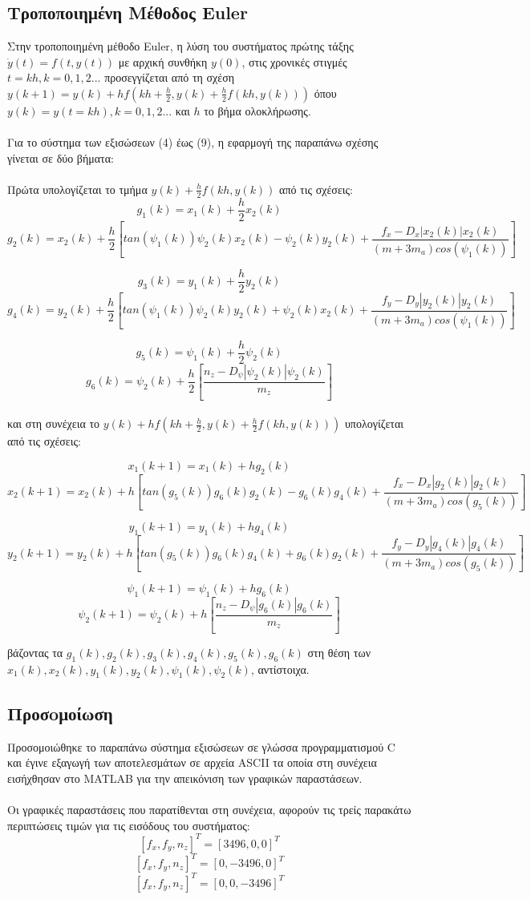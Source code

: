 \documentclass{article}
\begin{document}
\subsection{Τροποποιημένη Μέθοδος Euler}
Στην τροποποιημένη μέθοδο Euler, η λύση του συστήματος πρώτης τάξης \(\dot{y}(t) = f(t, y(t))\) με αρχική συνθήκη \(y(0)\), στις χρονικές στιγμές \(t = kh, k = 0, 1, 2...\) προσεγγίζεται από τη σχέση \(y(k+1) = y(k) + hf(kh + \frac{h}{2}, y(k) + \frac{h}{2}f(kh, y(k)))\) όπου \(y(k) = y(t = kh), k = 0, 1, 2...\) και \(h\) το βήμα ολοκλήρωσης.
\\\\
Για το σύστημα των εξισώσεων (4) έως (9), η εφαρμογή της παραπάνω σχέσης γίνεται σε δύο βήματα:
\\\\
Πρώτα υπολογίζεται το τμήμα \(y(k) + \frac{h}{2}f(kh, y(k))\) από τις σχέσεις: 
\[g_1(k) = x_1(k) + \frac{h}{2}x_2(k)\]
\[g_2(k) = x_2(k) + \frac{h}{2}[tan(\psi_1(k))\psi_2(k)x_2(k) - \psi_2(k)y_2(k) + \frac{f_x - D_x|x_2(k)|x_2(k)}{(m + 3m_a)cos(\psi_1(k))}]\]

\[ g_3(k)   = y_1(k) + \frac{h}{2}y_2(k)   \]
\[g_4(k) = y_2(k) + \frac{h}{2}[tan(\psi_1(k))\psi_2(k)y_2(k) + \psi_2(k)x_2(k) + \frac{f_y - D_y|y_2(k)|y_2(k)}{(m + 3m_a)cos(\psi_1(k))}]\]


\[ g_5(k)   = \psi_1(k) + \frac{h}{2}\psi_2(k)   \]
\[ g_6(k) = \psi_2(k) + \frac{h}{2}[\frac{n_z - D_\psi|\psi_2(k)|\psi_2(k)}{m_z}]\]
\\
και στη συνέχεια το \(y(k) + hf(kh + \frac{h}{2}, y(k) + \frac{h}{2}f(kh, y(k)))\) υπολογίζεται από τις σχέσεις:

\[x_1(k+1) = x_1(k) + hg_2(k)\]
\[x_2(k+1) = x_2(k) + h[tan(g_5(k))g_6(k)g_2(k) - g_6(k)g_4(k) + \frac{f_x - D_x|g_2(k)|g_2(k)}{(m + 3m_a)cos(g_5(k))}]\]

\[ y_1(k+1)   = y_1(k) + hg_4(k)   \]
\[y_2(k+1) = y_2(k) + h[tan(g_5(k))g_6(k)g_4(k) + g_6(k)g_2(k) + \frac{f_y - D_y|g_4(k)|g_4(k)}{(m + 3m_a)cos(g_5(k))}]\]


\[ \psi_1(k+1)   = \psi_1(k) + hg_6(k)   \]
\[ \psi_2(k+1) = \psi_2(k) + h[\frac{n_z - D_\psi|g_6(k)|g_6(k)}{m_z}]\]

βάζοντας τα \(g_1(k), g_2(k), g_3(k), g_4(k), g_5(k), g_6(k)\) στη θέση των \(x_1(k), x_2(k), y_1(k), y_2(k), \psi_1(k), \psi_2(k)\), αντίστοιχα.

\subsection{Προσoμοίωση}
Προσομοιώθηκε το παραπάνω σύστημα εξισώσεων σε γλώσσα προγραμματισμού C και έγινε εξαγωγή των αποτελεσμάτων σε αρχεία ASCII τα οποία στη συνέχεια εισήχθησαν στο MATLAB για την απεικόνιση των γραφικών παραστάσεων.
\\\\
Οι γραφικές παραστάσεις που παρατίθενται στη συνέχεια, αφορούν τις τρείς παρακάτω περιπτώσεις τιμών για τις εισόδους του συστήματος:
\[[f_x, f_y, n_z]^T = [3496, 0, 0]^T\]
\[[f_x, f_y, n_z]^T = [0, -3496, 0]^T\]
\[[f_x, f_y, n_z]^T = [0, 0, -3496]^T\] 
 
\end{document}
